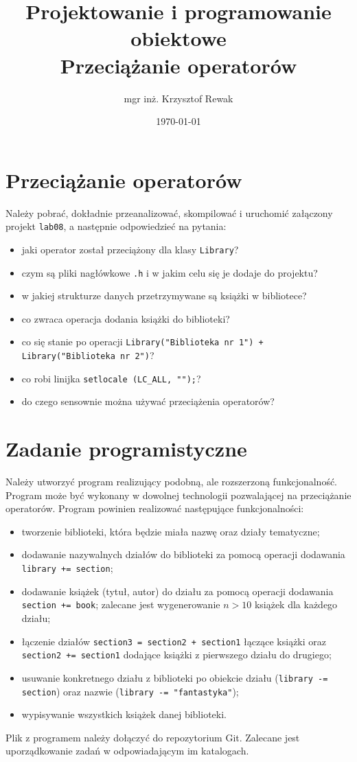 \documentclass{article}
\title{
	Projektowanie i programowanie obiektowe \\
	\Huge{Przeciążanie operatorów}
}
\author{mgr inż. Krzysztof Rewak}
\date{\today}
\begin{document}
	\maketitle

	\section{Przeciążanie operatorów}
	Należy pobrać, dokładnie przeanalizować, skompilować i uruchomić załączony projekt \texttt{lab08}, a następnie odpowiedzieć na pytania:
	
	\begin{itemize}
		\item jaki operator został przeciążony dla klasy \texttt{Library}?
		\item czym są pliki nagłówkowe \texttt{.h} i w jakim celu się je dodaje do projektu?
		\item w jakiej strukturze danych przetrzymywane są książki w bibliotece?
		\item co zwraca operacja dodania książki do biblioteki?
		\item co się stanie po operacji \texttt{Library("Biblioteka nr 1") + Library("Biblioteka nr 2")}?
		\item co robi linijka \texttt{setlocale (LC\_ALL, "");}?
		\item do czego sensownie można używać przeciążenia operatorów?
	\end{itemize}

	\section{Zadanie programistyczne}
	Należy utworzyć program realizujący podobną, ale rozszerzoną funkcjonalność. Program może być wykonany w dowolnej technologii pozwalającej na przeciążanie operatorów. Program powinien realizować następujące funkcjonalności:
	
	\begin{itemize}
		\item tworzenie biblioteki, która będzie miała nazwę oraz działy tematyczne;
		\item dodawanie nazywalnych działów do biblioteki za pomocą operacji dodawania \texttt{library += section};
		\item dodawanie książek (tytuł, autor) do działu za pomocą operacji dodawania \texttt{section += book}; zalecane jest wygenerowanie $n> 10$ książek dla każdego działu;
		\item łączenie działów \texttt{section3 = section2 + section1} łączące książki oraz \texttt{section2 += section1} dodające książki z pierwszego działu do drugiego;
		\item usuwanie konkretnego działu z biblioteki po obiekcie działu (\texttt{library -= section}) oraz nazwie (\texttt{library -= "fantastyka"});
		\item wypisywanie wszystkich książek danej biblioteki.
	\end{itemize}
	
	Plik z programem należy dołączyć do repozytorium Git. Zalecane jest uporządkowanie zadań w odpowiadającym im katalogach.
\end{document}
